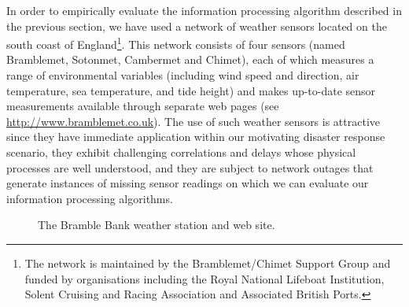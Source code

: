 \documentclass{acmtrans2m}
\begin{document}
\noindent In order to empirically evaluate the information processing algorithm described in the previous section, we have used a network of weather sensors located on the south coast of England\footnote{The network is maintained by the Bramblemet/Chimet Support Group and funded by organisations including the Royal National Lifeboat Institution, Solent Cruising and Racing Association and Associated British Ports.}. This network consists of four sensors (named Bramblemet, Sotonmet, Cambermet and Chimet), each of which measures a range of environmental variables (including wind speed and direction, air temperature, sea temperature, and tide height) and makes up-to-date sensor measurements available through separate web pages (see \small\url{http://www.bramblemet.co.uk}\normalsize). The use of such weather sensors is attractive since they have immediate application within our motivating disaster response scenario, they exhibit challenging correlations and delays whose physical processes are well understood, and they are subject to network outages that generate instances of missing sensor readings on which we can evaluate our information processing algorithms.

\begin{figure}
\begin{center}
 \hspace{0.25cm}
\caption{The Bramble Bank weather station and web site.}
\label{bramble_sensor}
\end{center}
\end{figure}
\end{document}
